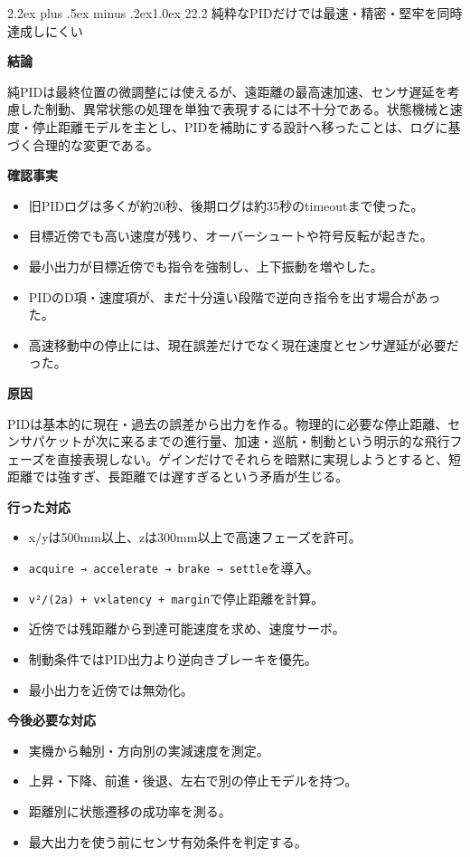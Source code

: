 \documentclass[10pt,a4paper,openany]{ltjsbook}
\makeatletter
\renewcommand\section{\@startsection{section}{1}{0pt}%
  {2.2ex plus .5ex minus .2ex}{1.0ex}%
  {\sffamily\Large\bfseries\color{ReportNavy}}}
\newcommand{\reportlabel}[1]{%
  \par\vspace{0.55em}%
  \noindent\colorbox{ReportTeal}{%
    \parbox{\dimexpr\linewidth-2\fboxsep\relax}{%
      \sffamily\bfseries\color{white}#1%
    }%
  }\par\vspace{0.20em}%
}
\makeatother
\begin{document}
\section{22.2 純粋なPIDだけでは最速・精密・堅牢を同時達成しにくい}
\reportlabel{結論}
純PIDは最終位置の微調整には使えるが、遠距離の最高速加速、センサ遅延を考慮した制動、異常状態の処理を単独で表現するには不十分である。状態機械と速度・停止距離モデルを主とし、PIDを補助にする設計へ移ったことは、ログに基づく合理的な変更である。\par
\reportlabel{確認事実}
\begin{itemize}
\item 旧PIDログは多くが約20秒、後期ログは約35秒のtimeoutまで使った。
\item 目標近傍でも高い速度が残り、オーバーシュートや符号反転が起きた。
\item 最小出力が目標近傍でも指令を強制し、上下振動を増やした。
\item PIDのD項・速度項が、まだ十分遠い段階で逆向き指令を出す場合があった。
\item 高速移動中の停止には、現在誤差だけでなく現在速度とセンサ遅延が必要だった。
\end{itemize}
\reportlabel{原因}
PIDは基本的に現在・過去の誤差から出力を作る。物理的に必要な停止距離、センサパケットが次に来るまでの進行量、加速・巡航・制動という明示的な飛行フェーズを直接表現しない。ゲインだけでそれらを暗黙に実現しようとすると、短距離では強すぎ、長距離では遅すぎるという矛盾が生じる。\par
\reportlabel{行った対応}
\begin{itemize}
\item x/yは500mm以上、zは300mm以上で高速フェーズを許可。
\item \texttt{acquire → accelerate → brake → settle}を導入。
\item \texttt{v²/(2a) + v×latency + margin}で停止距離を計算。
\item 近傍では残距離から到達可能速度を求め、速度サーボ。
\item 制動条件ではPID出力より逆向きブレーキを優先。
\item 最小出力を近傍では無効化。
\end{itemize}
\reportlabel{今後必要な対応}
\begin{itemize}
\item 実機から軸別・方向別の実減速度を測定。
\item 上昇・下降、前進・後退、左右で別の停止モデルを持つ。
\item 距離別に状態遷移の成功率を測る。
\item 最大出力を使う前にセンサ有効条件を判定する。
\end{itemize}
\end{document}
